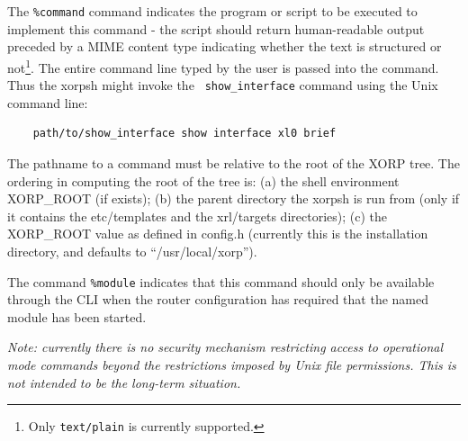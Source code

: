 \documentclass[11pt]{article}
\begin{document}
The {\tt \%command} command indicates the program or script to be
executed to implement this command - the script should return
human-readable output preceded by a MIME content type indicating
whether the text is structured or not\footnote{Only {\tt text/plain}
is currently supported.}.  The entire command line typed by the user
is passed into the command.  Thus the xorpsh might invoke the {\tt
show\_interface} command using the Unix command line:
\begin{verbatim}
    path/to/show_interface show interface xl0 brief
\end{verbatim}
The pathname to a command must be
relative to the root of the XORP tree. The ordering in computing the root of
the tree is: (a) the shell environment XORP\_ROOT (if exists); (b) the parent
directory the xorpsh is run from (only if it contains the
etc/templates and the xrl/targets directories); (c) the XORP\_ROOT value as
defined in config.h (currently this is the installation directory, and
defaults to ``/usr/local/xorp'').

The command {\tt \%module} indicates that this command should only be
available through the CLI when the router configuration has required
that the named module has been started.

\textit{Note: currently there is no security mechanism restricting
access to operational mode commands beyond the restrictions imposed by
Unix file permissions.  This is not intended to be the long-term
situation.}
\end{document}
